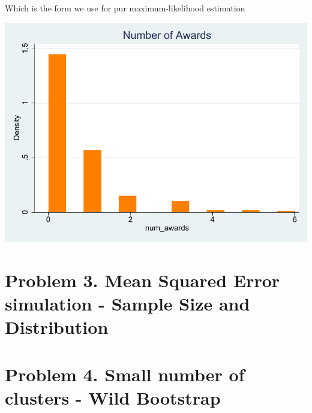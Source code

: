 \documentclass[12pt]{article}
\begin{document}
Which is the form we use for pur maximum-likelihood estimation
\begin{stlog}\end{stlog}
\begin{center}
    \includegraphics{797B_PS1_JL_5.pdf}
\end{center}


\section{Problem 3. Mean Squared Error simulation - Sample Size and Distribution}


\section{Problem 4. Small number of clusters - Wild Bootstrap}




\end{document}

